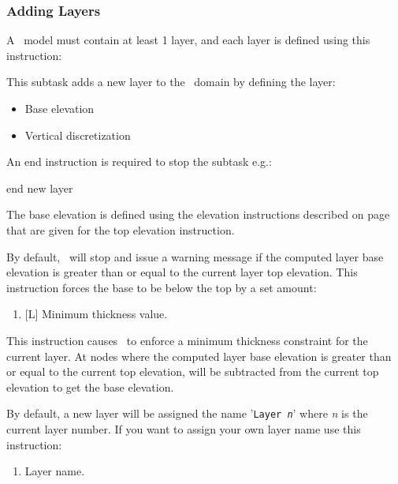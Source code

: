 \subsubsection{Adding Layers} 
A \mfus\ model must contain at least 1 layer, and each layer is defined using this instruction:     {

    {This subtask adds a new layer to the \gwf\ domain by defining the layer:
     \begin{itemize}
       \item Base elevation
       \item Vertical discretization
     \end{itemize}

    An end instruction is required to stop the subtask e.g.:

    {\Large \sf end new layer}
    }

The base elevation is defined using the elevation instructions  described on page~\pageref{'Page:TopElev'} that are given for the \textsf{top elevation} instruction.

By default, \mut\ will stop and issue a warning message if the computed layer base elevation is greater than or equal to the current layer top elevation.  This instruction forces the base to be below the top by a set amount:

    {\squish
    \begin{enumerate}
    \item {}[L]  Minimum thickness value.
    \end{enumerate}
    This instruction causes \mut\ to enforce a minimum thickness constraint for the current layer. At nodes where the computed layer base elevation is greater than or equal to the current top elevation,  will
    be subtracted from the current top elevation to get the base elevation.
    }


By default, a new layer will be assigned the name '\texttt{Layer {\em n}}' where {\em n} is the current layer number.  If you want to assign your own layer name use this instruction:

    {
    \squish
    \begin{enumerate}
    \item {} Layer name.
    \end{enumerate}
    \squish
    }


}
